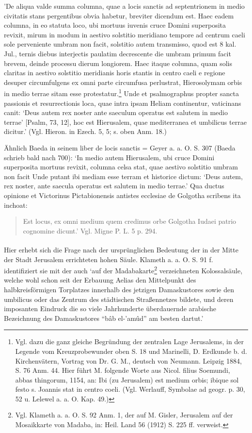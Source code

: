 \documentclass[a4paper, 11pt, oneside]{article}
\begin{document}
'De aliqua valde summa columna, quae a locis sanctis ad septentrionem in medio civitatis stans pergentibus obvia habetur, breviter dicendum est. Haec eadem columna, in eo statuta loco, ubi mortuus iuvenis cruce Domini superposita revixit, mirum in modum in aestivo solstitio meridiano tempore ad centrum caeli sole perveniente umbram non facit, solstitio autem transmisso, quod est 8 kal. Jul., ternis diebus interjectis paulatim decrescente die umbram primum facit brevem, deinde processu dierum longiorem. Haec itaque columna, quam solis claritas in aestivo solstitio meridianis horis stantis in centro caeli e regione desuper circumfulgens ex omni parte circumfusa perlustrat, Hierosolymam orbis in medio terrae sitam esse protestatur.\footnote{Vgl. dazu die ganz gleiche Begründung der zentralen Lage Jerusalems, in der Legende vom Kreuzprobewunder oben S. 18 und Marinelli, D. Erdkunde b. d. Kirchenvätern, Vortrag von Dr. G. M., deutsch von Neumann. Leipzig 1884, S. 76 Anm. 44. Hier führt M. folgende Worte aus Nicol. filius Soemundi, abbas thingorum, 1154, an: Ibi (zu Jerusalem) est medium orbis; ibique sol festo s. Joannis stat in centro coeli. (Vgl. Werlauff, Symbolae ad geogr. p. 30, 52 u. Lelewel a. a. O. Kap. 49.)} Unde et psalmographus propter sancta passionis et resurrectionis loca, quae intra ipsam Heliam continentur, vaticinans canit: `Deus autem rex noster ante saeculum operatus est salutem in medio terrae' [Psalm, 73, 12], hoc est Hierusalem, quae mediterranea et umbilicus terrae dicitur.' (Vgl. Hieron. in Ezech. 5, 5; s. oben Anm. 18.)

Ähnlich Baeda in seinem liber de locis sanctis = Geyer a. a. O. S. 307 (Baeda schrieb bald nach 700): `In medio autem Hierusalem, ubi cruce Domini superposita mortuus revixit, columna celsa stat, quae aestivo solstitio umbram non facit Unde putant ibi mediam esse terram et historice dictum: `Deus autem, rex noster, ante saecula operatus est salutem in medio terrae.' Qua ductus opinione et Victorinus Pictabionensis antistes ecclesiae de Golgotha scribens ita inchoat:
\begin{quotation}
Est locus, ex omni medium quem credimus orbe Golgotha Iudaei patrio cognomine dicunt.' Vgl. Migne P. L. 5 p. 294.
\end{quotation}
\paragraph{}
Hier erhebt sich die Frage nach der ursprünglichen Bedeutung der in der Mitte der Stadt Jerusalem errichteten hohen Säule. Klameth a. a. O. S. 91 f. identifiziert sie mit der auch `auf der Madabakarte\footnote{Vgl. Klameth a. a. O. S. 92 Anm. 1, der auf M. Gisler, Jerusalem auf der Mosaikkarte von Madaba, in: Heil. Land 56 (1912) S. 225 ff. verweist.} verzeichneten Kolossalsäule, welche wohl schon seit der Erbauung Aelias den Mittelpunkt des halbkreisförmigen Torplatzes innerhalb des jetzigen Damaskustores sowie den umbilicus oder das Zentrum des städtischen Straßennetzes bildete, und deren imposanten Eindruck die so viele Jahrhunderte überdauernde arabische Bezeichnung des Damaskustores "`bâb el-'amûd"' am besten dartut.'
\end{document}
